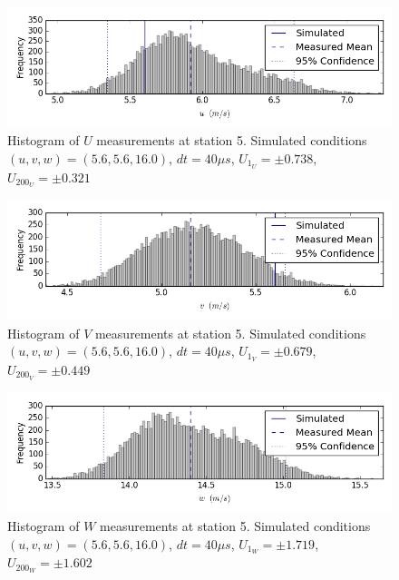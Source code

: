 \begin{figure}[H]
\centering
\includegraphics[width=6in]{figs/Ely_May28th05002/uncertainty_Ely_May28th05002_U}
\caption{Histogram of $U$ measurements at station 5. Simulated conditions $(u,v,w)=(5.6, 5.6, 16.0)$, $dt=40 \mu s$, $U_1_U=\pm 0.738$, $U_200_U=\pm 0.321$}
\label{fig:uncertainty_Ely_May28th05002_U}
\end{figure}


\begin{figure}[H]
\centering
\includegraphics[width=6in]{figs/Ely_May28th05002/uncertainty_Ely_May28th05002_V}
\caption{Histogram of $V$ measurements at station 5. Simulated conditions $(u,v,w)=(5.6, 5.6, 16.0)$, $dt=40 \mu s$, $U_1_V=\pm 0.679$, $U_200_V=\pm 0.449$}
\label{fig:uncertainty_Ely_May28th05002_V}
\end{figure}


\begin{figure}[H]
\centering
\includegraphics[width=6in]{figs/Ely_May28th05002/uncertainty_Ely_May28th05002_W}
\caption{Histogram of $W$ measurements at station 5. Simulated conditions $(u,v,w)=(5.6, 5.6, 16.0)$, $dt=40 \mu s$, $U_1_W=\pm 1.719$, $U_200_W=\pm 1.602$}
\label{fig:uncertainty_Ely_May28th05002_W}
\end{figure}


